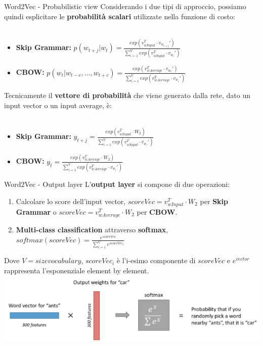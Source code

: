 \documentclass[british]{beamer}
\begin{document}
\begin{frame}{Word2Vec - Probabilistic view}
	Considerando i due tipi di approccio, possiamo quindi esplicitare le \textbf{probabilit\`{a} scalari} utilizzate nella funzione di costo:
	\\~\\
	\begin{itemize}
		\item \textbf{Skip Grammar: }
		\(p(w_{t+j}|w_{t}) = \frac{exp(v_{wInput}^T \cdot v_{w_{t+j}}')}{\sum_{i=1}^{V}exp(v_{wInput}^T \cdot v_{w_i}')}\)
		\item \textbf{CBOW: }
		\(p(w_{t}|w_{t-c}, ... , w_{t+c}) = \frac{exp(v_{wAverage}^T \cdot v_{w_{t}}')}{\sum_{i=1}^{V}exp(v_{wAverage}^T \cdot v_{w_i}')}\)
	\end{itemize}
	Tecnicamente il \textbf{vettore di probabilit\`{a}} che viene generato dalla rete, dato un input vector o un input average, \`{e}:
	\\~\\
	\begin{itemize}
		\item \textbf{Skip Grammar: }
		\(y_{t+j} = \frac{exp(v_{wInput}^T \cdot W_2)}{\sum_{i=1}^{V}exp(v_{wInput}^T \cdot v_{w_i}')}\)
		\item \textbf{CBOW: }
		\(y_t = \frac{exp(v_{wAverage}^T \cdot W_2)}{\sum_{i=1}^{V}exp(v_{wAverage}^T \cdot v_{w_i}')}\)
	\end{itemize}
\end{frame}

\begin{frame}{Word2Vec - Output layer}
	L'\textbf{output layer} si compone di due operazioni:
	\begin{enumerate}
		\item Calcolare lo score dell'input vector, \(scoreVec = v_{wInput}^T \cdot W_2\) per \textbf{Skip Grammar} o \(scoreVec = v_{wAverage}^T \cdot W_2\) per \textbf{CBOW}.
		\item \textbf{Multi-class classification} attraverso \textbf{softmax}, \(softmax(scoreVec) = \frac{e^{scoreVec}}{\sum_{i=1}^{V}e^{scoreVec_i}}\)
	\end{enumerate}
	Dove \(V = sizevocabulary\), \(scoreVec_i\) \`{e} l'i-esimo componente di \(scoreVec\) e \(e^{vector}\) rappresenta l'esponenziale element by element.
	\includegraphics[width=0.9\linewidth,height=0.25\textwidth]{./Imgs/output_layer}
\end{frame}
\end{document}
